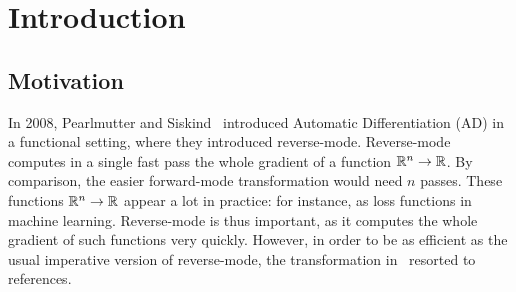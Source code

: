 \section{Introduction}
\label{sec:intro}



\subsection{Motivation}

In 2008, Pearlmutter and Siskind~\cite{pearlmutter2008reverse} introduced Automatic Differentiation (AD) in a functional setting, where they introduced reverse-mode. 
Reverse-mode computes in a single fast pass the whole gradient of a function $\mathbb{R}^n\to\mathbb{R}$.
By comparison, the easier forward-mode transformation would need $n$ passes. 
These functions $\mathbb{R}^n\to\mathbb{R}$ appear a lot in practice: for instance, as loss functions in machine learning.
Reverse-mode is thus important, as it computes the whole gradient of such functions very quickly. 
However, in order to be as efficient as the usual imperative version of reverse-mode, the transformation in~\cite{pearlmutter2008reverse} resorted to references.

